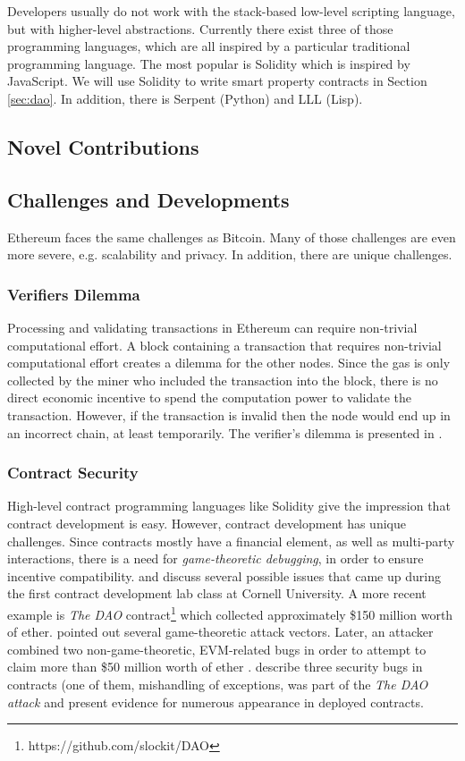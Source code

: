 Developers usually do not work with the stack-based low-level scripting language, but with higher-level abstractions. Currently there exist three of those programming languages, which are all inspired by a particular traditional programming language. The most popular is Solidity which is inspired by JavaScript. We will use Solidity to write smart property contracts in Section \ref{sec:dao}. In addition, there is Serpent (Python) and LLL (Lisp).

\subsection{Novel Contributions}

\subsection{Challenges and Developments}

Ethereum faces the same challenges as Bitcoin. Many of those challenges are even more severe, e.g. scalability and privacy. In addition, there are unique challenges.

\subsubsection{Verifiers Dilemma}
Processing and validating transactions in Ethereum can require non-trivial computational effort.
A block containing a transaction that requires non-trivial computational effort creates a dilemma for the other nodes. Since the gas is only collected by the miner who included the transaction into the block, there is no direct economic incentive to spend the computation power to validate the transaction. However, if the transaction is invalid then the node would end up in an incorrect chain, at least temporarily.
The verifier's dilemma is presented in \parencite{Luu:2015:DIC:2810103.2813659}.

\subsubsection{Contract Security}

High-level contract programming languages like Solidity give the impression that contract development is easy. However, contract development has unique challenges. Since contracts mostly have a financial element, as well as multi-party interactions, there is a need for \emph{game-theoretic debugging}, in order to ensure incentive compatibility. \cite{delmolino2015programmer} and \cite{delmolino2015step} discuss several possible issues that came up during the first contract development lab class at Cornell University. A more recent example is \emph{The DAO} contract\footnote{https://github.com/slockit/DAO} which collected approximately \$150 million worth of ether. \cite{mark2016} pointed out several game-theoretic attack vectors. Later, an attacker combined two non-game-theoretic, EVM-related bugs in order to attempt to claim more than \$50 million worth of ether \parencite{daian2016dao}. \cite{cryptoeprint:2016:633} describe three security bugs in contracts (one of them, mishandling of exceptions, was part of the \emph{The DAO attack} and present evidence for numerous appearance in deployed contracts.

